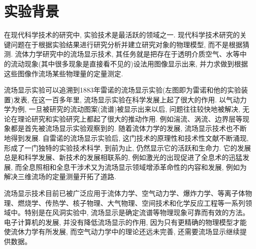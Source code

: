 \documentclass[12pt,a4paper,boxed,titlepage]{caspset}
\begin{document}

\setlength{\parskip}{0.3em}
\setcounter{page}{0}
\tableofcontents
\listoffigures

\newpage
\section{实验背景}

在现代科学技术的研究中, 实验技术是最活跃的领域之一. 现代科学技术研究的关键问题在于根据实验结果进行研究分析并建立研究对象的物理模型, 而不是根据猜测. 流体力学研究中的流场显示技术, 其任务就是把存在于透明介质空气、水等中的流动现象(其中很多现象是直接看不见的)设法用图像显示出来, 并力求做到根据这些图像作流场某些物理量的定量测定.

\begin{multicols}{2}
流场显示实验可以追溯到1883年雷诺的流场显示实验(左图即为雷诺和他的实验装置)发表, 在这一百多年里, 流场显示实验在科学发展上起了很大的作用. 以气动力学为例, 一旦被研究的流动图案(流谱)被显示出来以后, 问题往往较快地被解决, 无论在理论研究和实验研究上都起了很大的推动作用. 例如湍流、涡流、边界层等现象都是首先被流场显示实验观察到的. 随着流体力学的发展, 流场显示技术也不断地得到发展. 自雷诺的流场显示实验后, 这门技术的原理性和技术性文献不断涌现, 形成了一门独特的实验技术科学, 到前为止, 仍然显示它的活跃和生命力. 它的发展总是和科学发展、新技术的发展相联系的, 例如激光的出现促进了全息术的迅猛发展, 而全息照相和全息干涉术又为流场显示领域增添革命性的内容和发展, 例如为解决三维流场的定量测量开拓了道路.

\begin{center}
\end{center}

\end{multicols}

流场显示技术目前已被广泛应用于流体力学、空气动力学、爆炸力学、等离子体物理、燃烧学、传热学、核子物理、大气物理、空间技术和化学反应工程等一系列领域中。特别是在风洞实验中, 流场显示是确定流谱等物理现象可靠而有效的方法。电子计算机的发展, 并没有降低流场显示的作用, 因为只有更精确的物理模型才能使流休力学有所发展, 而空气动力学中的理论还远未完善, 还需要流场显示继续提供数据。
\end{document}
